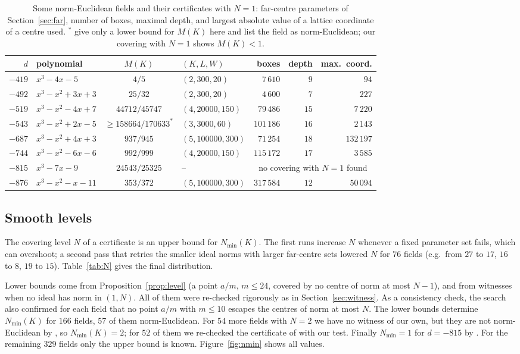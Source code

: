 \documentclass[11pt]{amsart}
\theoremstyle{definition}
\theoremstyle{remark}
\numberwithin{equation}{section}
\newcommand{\Nmin}{N_{\min}}
\begin{document}
\begin{table}[ht]
\centering\small
\begin{tabular}{rlclrrr}
\toprule
$d$ & polynomial & $M(K)$ \cite{CL} & $(K,L,W)$ & boxes & depth & max.\ coord.\\
\midrule
$-419$ & $x^3-4x-5$ & $4/5$ & $(2,300,20)$ & $7\,610$ & $9$ & $94$\\
$-492$ & $x^3-x^2+3x+3$ & $25/32$ & $(2,300,20)$ & $4\,600$ & $7$ & $227$\\
$-519$ & $x^3-x^2-4x+7$ & $44712/45747$ & $(4,20000,150)$ & $79\,486$ & $15$ & $7\,220$\\
$-543$ & $x^3-x^2+2x-5$ & $\ge 158664/170633^{*}$ & $(3,3000,60)$ & $101\,186$ & $16$ & $2\,143$\\
$-687$ & $x^3-x^2+4x+3$ & $937/945$ & $(5,100000,300)$ & $71\,254$ & $18$ & $132\,197$\\
$-744$ & $x^3-x^2-6x-6$ & $992/999$ & $(4,20000,150)$ & $115\,172$ & $17$ & $3\,585$\\
$-815$ & $x^3-7x-9$ & $24543/25325$ & -- & \multicolumn{3}{c}{no covering with $N=1$ found}\\
$-876$ & $x^3-x^2-x-11$ & $353/372$ & $(5,100000,300)$ & $317\,584$ & $12$ & $50\,094$\\
\bottomrule
\end{tabular}
\caption{Some norm-Euclidean fields and their certificates with $N=1$: far-centre parameters
of Section~\ref{sec:far}, number of boxes, maximal depth, and largest absolute value of a
lattice coordinate of a centre used. ${}^{*}$\cite{CL} give only a lower bound for $M(K)$ here
and list the field as norm-Euclidean; our covering with $N=1$ shows $M(K)<1$.}
\label{tab:hard}
\end{table}

\subsection{Smooth levels}\label{sec:smooth}
The covering level $N$ of a certificate is an upper bound for $\Nmin(K)$. The first runs increase
$N$ whenever a fixed parameter set fails, which can overshoot; a second pass that retries the
smaller ideal norms with larger far-centre sets lowered $N$ for $76$ fields (e.g.\ from $27$ to
$17$, $16$ to $8$, $19$ to $15$). Table~\ref{tab:N} gives the final distribution.

Lower bounds come from Proposition~\ref{prop:level} (a point $a/m$, $m\le24$, covered by no
centre of norm at most $N-1$), and from witnesses when no ideal has norm in $(1,N)$. All of them
were re-checked rigorously as in Section~\ref{sec:witness}. As a consistency check, the search
also confirmed for each field that no point $a/m$ with $m\le10$ escapes the centres of norm at
most $N$. The lower bounds determine $\Nmin(K)$ for $166$ fields, $57$ of them norm-Euclidean.
For $54$ more fields with $N=2$ we have no witness of our own, but they are not
norm-Euclidean by \cite{BBT}, so $\Nmin(K)=2$; for $52$ of them we re-checked the certificate
of \cite{BBT} with our test. Finally $\Nmin=1$ for $d=-815$ by \cite{CL,BBT}. For the
remaining $329$ fields only the upper bound is known. Figure~\ref{fig:nmin} shows all values.
\end{document}
